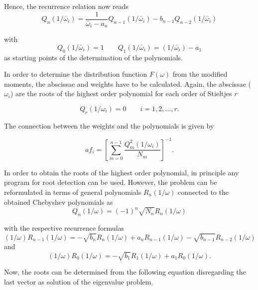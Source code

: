Hence, the recurrence relation now reads
\begin{equation}
  Q_n(1/\bar{\omega}_i) = \frac{1}{\bar{\omega}_i - a_n} Q_{n-1}(1/\bar{\omega}_i)
                          - b_{n-1} Q_{n-2}(1/\bar{\omega}_i)
\end{equation}

with
\begin{equation}
  Q_0(1/\bar{\omega}_i) = 1 \quad\quad Q_1(1/\bar{\omega}_i) = (1/\bar{\omega}_i) - a_1
\end{equation}
as starting points of the determination of the polynomials.

In order to determine the
distribution function $F(\omega)$ from the modified moments, the abscissae and
weights have to be calculated.
Again, the abscissae ($\omega_i$) are the roots of the
highest order polynomial
for each order of Stieltjes $r$

\begin{equation}
  Q_r(1/\omega_i) = 0 \quad\quad i = 1,2,\dots ,r .
\end{equation}

The connection between the weights and the polynomials is given by

\begin{equation}a  \label{equation:poly_weights}
  f_i = \left[ \sum\limits_{m=0}^{n-1} \frac{Q_m^2(1/\omega_i)}{N_m} \right]^{-1} .
\end{equation}

In order to obtain the roots of the highest order polynomial, in principle
any program for root detection can be used. However, the problem can
be reformulated in terms of general polynomials $R_n(1/\omega)$ connected
to the obtained Chebyshev polynomials as
\begin{equation}
  Q_n(1/\omega) = (-1)^n \sqrt{N_n} R_n(1/\omega)
\end{equation}

with the respective recurrence formulas
\begin{equation}
  (1/\omega)R_{n-1}(1/\omega) = - \sqrt{b_n}R_n(1/\omega) + a_nR_{n-1}(1/\omega)
                                - \sqrt{b_{n-1}} R_{n-2}(1/\omega)
\end{equation}
and
\begin{equation}
  (1/\omega)R_0(1/\omega) = - \sqrt{b_1}R_1(1/\omega) + a_1 R_0(1/\omega) .
\end{equation}

Now, the roots can be determined from the following equation disregarding the
last vector as solution of the eigenvalue problem.

